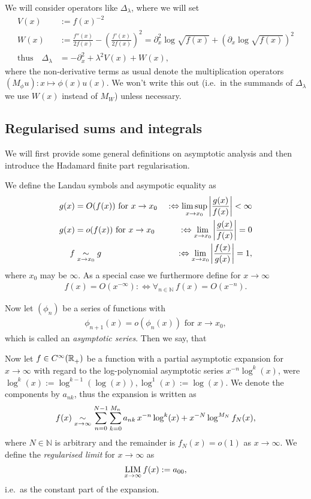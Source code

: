 We will consider operators like $\Delta_\lambda$, where we will set
\begin{align}
  V(x) &:= f(x)^{-2} \\
  W(x) &:= \frac{f''(x)}{2f(x)} - \left(\frac{f'(x)}{2f(x)}\right)^2 =
  \partial_x^2 \log\sqrt{f(x)} + \left(\partial_x \log\sqrt{f(x)}\right)^2 \\
  \text{thus}\quad \Delta_\lambda &= -\partial^2_x + \lambda^2 V(x) + W(x),
\end{align}
where the non-derivative terms as usual denote the multiplication operators
$(M_\phi u)\colon x \mapsto \phi(x)u(x)$. We won't write this out (i.e.\ in the
summands of $\Delta_\lambda$ we use $W(x)$ instead of $M_W$) unless necessary.

\subsection{Regularised sums and integrals}
We will first provide some general definitions on asymptotic analysis and then
introduce the Hadamard finite part regularisation.

We define the Landau symbols and asympotic equality as
\begin{align}
  g(x) &= O(f(x))\text{ for $x\to x_0$ } &:\Leftrightarrow \limsup_{x\to x_0}
  \left|\frac{g(x)}{f(x)}\right| < \infty \\
  g(x) &= o(f(x))\text{ for $x\to x_0$ } &:\Leftrightarrow \lim_{x\to
x_0}\left|\frac{g(x)}{f(x)}\right| = 0 \\
f &\mathrel{\underset{x\to x_0}{\sim}} g &:\Leftrightarrow \lim_{x\to x_0}
\left|\frac{f(x)}{g(x)}\right| = 1,
\end{align}
where $x_0$ may be $\infty$. As a special case we furthermore define for
$x\to\infty$
\begin{align}
  f(x) = O(x^{-\infty}) :\Leftrightarrow \forall_{n\in\mathbb{N}}\ f(x) =
  O(x^{-n}).
\end{align}

Now let $(\phi_n)$ be a series of functions with
\begin{align*}
  \phi_{n+1}(x) = o(\phi_n(x))\text{ for $x\to x_0$},
\end{align*}
which is called an \emph{asymptotic series}. Then we say, that



Now let $f\in C^\infty_{}({\mathbb{R}_+^{}})$ be a function with a partial asymptotic expansion
for $x\to\infty$ with regard to the log-polynomial asymptotic series
$x^{-n}\log^k(x)$, were $\log^k(x) := \log^{k-1}(\log(x)), \log^1(x) :=
\log(x)$. We denote the components by $a_{nk}$, thus the expansion is
written as
\begin{align*}
  f(x) \mathrel{\underset{x\to\infty}{\sim}} \sum_{n=0}^{N-1}\sum_{k=0}^{M_n}
  a_{nk}\,x^{-n}\log^k(x) + x^{-N}\log^{M_N}f_N(x),
\end{align*}
where $N\in\mathbb{N}$ is arbitrary and the remainder is $f_N(x) = o(1)$ as
$x\to\infty$. We define the \emph{regularised limit} for $x\to\infty$ as
\begin{align}
  \operatorname*{LIM}_{x\to\infty} f(x) := a_{00},
\end{align}
i.e.\ as the constant part of the expansion.


